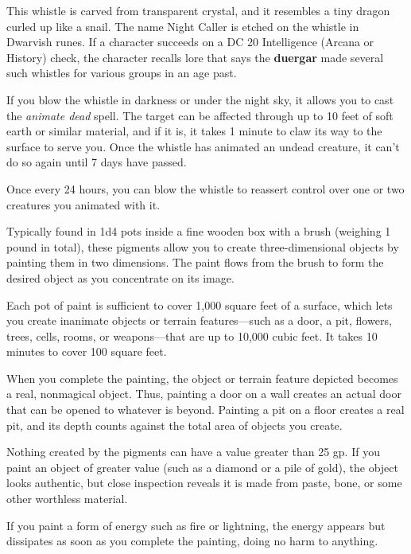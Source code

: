 \documentclass[10pt,a4paper,twoside,bg=print,twocolumn,openany,nodeprecatedcode]{dndbook}
\begin{document}
This whistle is carved from transparent crystal, and it resembles a tiny dragon curled up like a snail. The name Night Caller is etched on the whistle in Dwarvish runes. If a character succeeds on a DC 20 Intelligence (Arcana or History) check, the character recalls lore that says the \textbf{duergar} made several such whistles for various groups in an age past.

If you blow the whistle in darkness or under the night sky, it allows you to cast the \textit{animate dead} spell. The target can be affected through up to 10 feet of soft earth or similar material, and if it is, it takes 1 minute to claw its way to the surface to serve you. Once the whistle has animated an undead creature, it can't do so again until 7 days have passed.

Once every 24 hours, you can blow the whistle to reassert control over one or two creatures you animated with it.

Typically found in 1d4 pots inside a fine wooden box with a brush (weighing 1 pound in total), these pigments allow you to create three-dimensional objects by painting them in two dimensions. The paint flows from the brush to form the desired object as you concentrate on its image.

Each pot of paint is sufficient to cover 1,000 square feet of a surface, which lets you create inanimate objects or terrain features—such as a door, a pit, flowers, trees, cells, rooms, or weapons—that are up to 10,000 cubic feet. It takes 10 minutes to cover 100 square feet.

When you complete the painting, the object or terrain feature depicted becomes a real, nonmagical object. Thus, painting a door on a wall creates an actual door that can be opened to whatever is beyond. Painting a pit on a floor creates a real pit, and its depth counts against the total area of objects you create.

Nothing created by the pigments can have a value greater than 25 gp. If you paint an object of greater value (such as a diamond or a pile of gold), the object looks authentic, but close inspection reveals it is made from paste, bone, or some other worthless material.

If you paint a form of energy such as fire or lightning, the energy appears but dissipates as soon as you complete the painting, doing no harm to anything.
\end{document}
